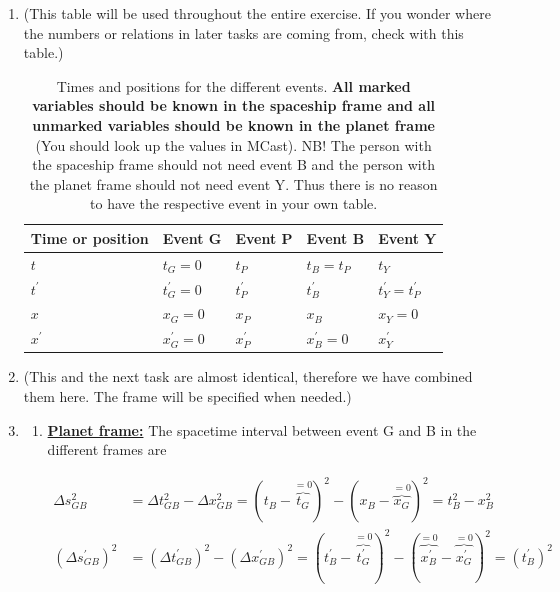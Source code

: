 \documentclass[a4paper,10pt,english]{article}
\begin{document}
\begin{enumerate}

\item (This table will be used throughout the entire exercise. If you wonder where the numbers or relations in later tasks are coming from, check with this table.)

\begin{table}[H]
  \begin{center}
    \begin{tabular}{| l | l | l | l | l |}
   	\hline
	 Time or position & Event G & Event P & Event B & Event Y\\ \hline
	 $t$ & $t_{G}=0$ & $t_{P}$ & $t_{B}=t_{P}$ & $t_{Y}$\\ \hline
	 $t^{\prime}$ & $t^{\prime}_{G}=0$ & $t_{P}^{\prime}$ & $t_{B}^{\prime}$ & $t^{\prime}_{Y}=t^{\prime}_{P}$\\ \hline
	 $x$ & $x_{G}=0$ & $x_{P}$ & $x_{B}$ & $x_{Y}=0$\\ \hline
	 $x^{\prime}$ & $x^{\prime}_{G}=0$ & $x_{P}^{\prime}$ & $x_{B}^{\prime}=0$ & $x^{\prime}_{Y}$\\ \hline
	\end{tabular}
    \caption{Times and positions for the different events. \textbf{All marked variables should be known in the spaceship frame and all unmarked variables should be known in the planet frame} (You should look up the values in MCast). NB! The person with the spaceship frame should not need event B and the person with the planet frame should not need event Y. Thus there is no reason to have the respective event in your own table.}
    \label{tabel:ex_2A_6}
  \end{center}
\end{table}
\FloatBarrier

\item (This and the next task are almost identical, therefore we have combined them here. The frame will be specified when needed.)
\item 
\begin{enumerate}

\item \underline{\bf{Planet frame:}} The spacetime interval between event G and B in the different frames are

\begin{align*}
\Delta s_{GB}^2&=\Delta t_{GB}^2-\Delta x_{GB}^2=(t_{B}-\overbrace{t_{G}}^{=0})^2-(x_{B}-\overbrace{x_{G}}^{=0})^2=t_{B}^2-x_{B}^2\\
(\Delta s_{GB}^{\prime})^2&=(\Delta t_{GB}^{\prime})^2-(\Delta x_{GB}^{\prime})^2=(t_{B}^{\prime}-\overbrace{t^{\prime}_{G}}^{=0})^2-(\overbrace{x_{B}^{\prime}}^{=0}-\overbrace{x^{\prime}_{G}}^{=0})^2=(t_{B}^{\prime})^2
\end{align*}


\end{enumerate}
\end{enumerate}
\end{document}
